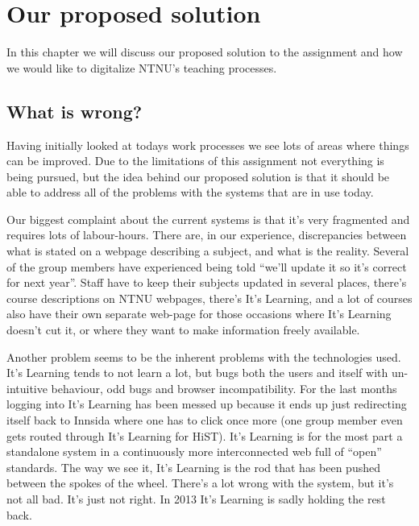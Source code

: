 \section{Our proposed solution}

In this chapter we will discuss our proposed solution to the assignment and how we would like to digitalize NTNU's teaching processes. 

\subsection{What is wrong?}
Having initially looked at todays work processes we see lots of areas where things can be improved. Due to the limitations of this assignment not everything
is being pursued, but the idea behind our proposed solution is that it should be able to address all of the problems with the systems that are in use today. 

\noindent
Our biggest complaint about the current systems is that it's very fragmented and requires lots of labour-hours. There are, in our experience, discrepancies between what is 
stated on a webpage describing a subject, and what is the reality. Several of the group members have experienced being told ``we'll update it so it's correct for next year''. 
Staff have to keep their subjects updated in several places, there's course descriptions on NTNU webpages, there's It's Learning, and a lot of courses also have their own separate
web-page for those occasions where It's Learning doesn't cut it, or where they want to make information freely available. 

\noindent
Another problem seems to be the inherent problems with the technologies used. It's Learning tends to not learn a lot, but bugs both the users and itself with un-intuitive behaviour, 
odd bugs and browser incompatibility. For the last months logging into It's Learning has been messed up because it ends up just redirecting itself back to Innsida where one has to 
click once more (one group member even gets routed through It's Learning for HiST). It's Learning is for the most part a standalone system in a continuously more interconnected web full of ``open'' standards. The way we see it, It's Learning is the 
rod that has been pushed between the spokes of the wheel. There's a lot wrong with the system, but it's not all bad. It's just not right. In 2013 It's Learning is sadly holding the 
rest back. 

